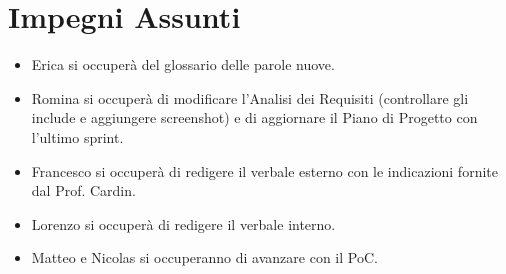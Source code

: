 \documentclass[a4paper, 12pt]{article}
\begin{document}
\section*{Impegni Assunti}
\begin{itemize}
    \item Erica si occuperà del glossario delle parole nuove.
    \item Romina si occuperà di modificare l'Analisi dei Requisiti (controllare gli include e aggiungere screenshot) e di aggiornare il Piano di Progetto con l'ultimo sprint.
    \item Francesco si occuperà di redigere il verbale esterno con le indicazioni fornite dal Prof. Cardin.
    \item Lorenzo si occuperà di redigere il verbale interno.
    \item Matteo e Nicolas si occuperanno di avanzare con il PoC.
\end{itemize}
\end{document}
